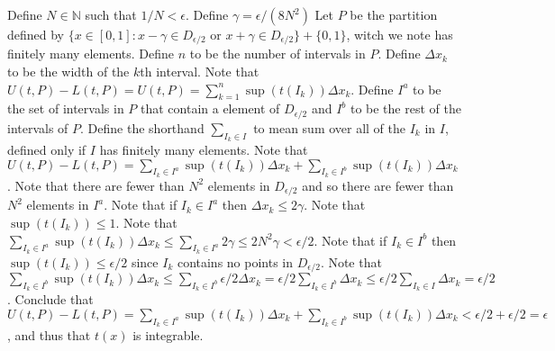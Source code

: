 \documentclass[12pt]{article}
\theoremstyle{homework}
\begin{document}
\begin{enumerate}[(a)]
Define $N\in\mathbb{N}$ such that $1/N<\epsilon$.  Define $\gamma=\epsilon/(8N^2)$  Let $P$ be the partition defined by $\{x\in[0,1]:x-\gamma\in D_{\epsilon/2}\text{ or } x+\gamma \in D_{\epsilon/2}\} +\{0,1\}$, witch we note has finitely many elements.  Define $n$ to be the number of intervals in $P$.  Define $\Delta x_k$ to be the width of the $k$th interval.  Note that $U(t,P)-L(t,P)=U(t,P)=\sum_{k=1}^{n} \sup(t(I_k))\Delta x_k$.  Define $I^a$ to be the set of intervals in $P$ that contain a element of $D_{\epsilon/2}$ and $I^b$ to be the rest of the intervals of $P$.  Define the shorthand $\sum_{I_k\in I}$ to mean sum over all of the $I_k$ in $I$, defined only if $I$ has finitely many elements.  Note that $U(t,P)-L(t,P)=\sum_{I_k\in I^a} \sup(t(I_k))\Delta x_k+\sum_{I_k\in I^b} \sup(t(I_k))\Delta x_k$.  Note that there are fewer than $N^2$ elements in $D_{\epsilon/2}$ and so there are fewer than $N^2$ elements in $I^a$.  Note that if $I_k\in I^a$ then $\Delta x_k\leq 2\gamma$.  Note that $\sup(t(I_k))\leq 1$.  Note that $\sum_{I_k\in I^a} \sup(t(I_k))\Delta x_k\leq \sum_{I_k\in I^a} 2\gamma\leq 2N^2\gamma<\epsilon/2$.  Note that if $I_k\in I^b$ then $\sup(t(I_k))\leq \epsilon/2$ since $I_k$ contains no points in $D_{\epsilon/2}$.  Note that $\sum_{I_k\in I^b} \sup(t(I_k))\Delta x_k\leq \sum_{I_k\in I^b} \epsilon/2\Delta x_k=\epsilon/2 \sum_{I_k\in I^b} \Delta x_k\leq \epsilon/2 \sum_{I_k\in I} \Delta x_k=\epsilon/2$.  Conclude that $U(t,P)-L(t,P)=\sum_{I_k\in I^a} \sup(t(I_k))\Delta x_k+\sum_{I_k\in I^b} \sup(t(I_k))\Delta x_k<\epsilon/2+\epsilon/2=\epsilon$, and thus that $t(x)$ is integrable.
\end{enumerate}
\end{document}
